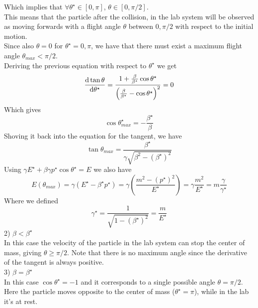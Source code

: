 \documentclass[../admech.tex]{subfiles}
\begin{document}
Which implies that $\forall\theta^\star\in[0,\pi]$, $\theta\in[0,\pi/2]$.\\
This means that the particle after the collision, in the lab system will be observed as moving forwards with a flight angle $\theta$ between $0,\pi/2$ with respect to the initial motion.\\
Since also $\theta=0$ for $\theta^\star=0,\pi$, we have that there must exist a maximum flight angle $\theta_{max}<\pi/2$.\\
Deriving the previous equation with respect to $\theta^\star$ we get
\begin{equation*}
	\dv{\tan\theta}{\theta^\star}=\frac{1+\frac{\beta}{\beta^\star}\cos\theta^\star}{\left( \frac{\beta}{\beta^\star}-\cos\theta^\star \right)^2}=0
\end{equation*}
Which gives
\begin{equation}
	\cos\theta_{max}^\star=-\frac{\beta^\star}{\beta}
	\label{eq:maxflightangle}
\end{equation}
Shoving it back into the equation for the tangent, we have
\begin{equation}
	\tan\theta_{max}=\frac{\beta^\star}{\gamma\sqrt{\beta^2-\left(\beta^\star\right)^2}}
	\label{eq:tanthetamaxrel}
\end{equation}
Using $\gamma E^\star+\beta\gamma p^\star\cos\theta^\star=E$ we also have
\begin{equation}
	E(\theta_{max})=\gamma\left( E^\star-\beta^\star p^\star \right)=\gamma\left( \frac{m^2-\left(p^\star\right)^2}{E^\star} \right)=\gamma\frac{m^2}{E^\star}=m\frac{\gamma}{\gamma^\star}
	\label{eq:gammaongammastarthetamax}
\end{equation}
Where we defined
\begin{equation}
	\gamma^\star=\frac{1}{\sqrt{1-\left( \beta^\star \right)^2}}=\frac{m}{E^\star}
	\label{eq:gammastar}
\end{equation}
2) $\beta<\beta^\star$\\
In this case the velocity of the particle in the lab system can stop the center of mass, giving $\theta\ge\pi/2$. Note that there is no maximum angle since the derivative of the tangent is always positive.\\
3) $\beta=\beta^\star$\\
In this case $\cos\theta^\star=-1$ and it corresponds to a single possible angle $\theta=\pi/2$. Here the particle moves opposite to the center of mass ($\theta^\star=\pi$), while in the lab it's at rest.
\end{document}
